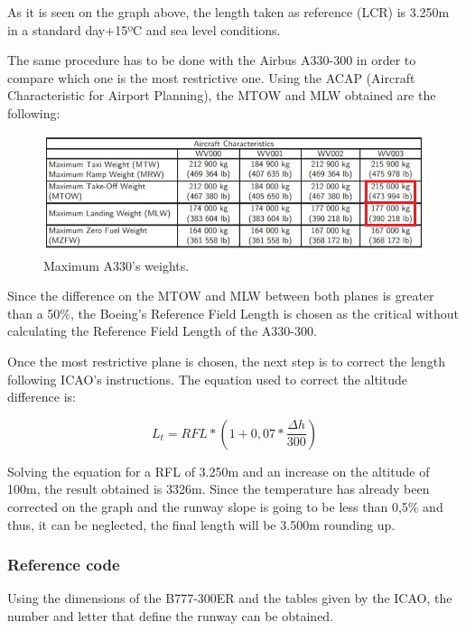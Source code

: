 			As it is seen on the graph above, the length taken as reference (LCR) is 3.250m in a standard day+15ºC and sea level conditions. 
			
			The same procedure has to be done with the Airbus A330-300 in order to compare which one is the most restrictive one. Using the ACAP (Aircraft Characteristic for Airport Planning), the MTOW and MLW obtained are the following:
			
			\begin{figure}[H]
				\centering
				\includegraphics[clip, trim=0cm 0cm 0cm 0cm, width=1\textwidth]{./images/A330/A330}
				\caption{Maximum A330's weights.} %
				\label{} %
			\end{figure}
			
			Since the difference on the MTOW and MLW between both planes is greater than a 50\%, the Boeing’s Reference Field Length is chosen as the critical without calculating the Reference Field Length of the A330-300.
			
			Once the most restrictive plane is chosen, the next step is to correct the length following ICAO’s instructions. The equation used to correct the altitude difference is:
			
			\[L_t=RFL*(1+0,07*\frac{\Delta h}{300})\]
			
			Solving the equation for a RFL of 3.250m and an increase on the altitude of 100m, the result obtained is 3326m.
			Since the temperature has already been corrected on the graph and the runway slope is going to be less than 0,5\% and thus, it can be neglected, the final length will be 3.500m rounding up.
		
			\subsubsection{Reference code}
			Using the dimensions of the B777-300ER and the tables given by the ICAO, the number and letter that define the runway can be obtained. 
			
